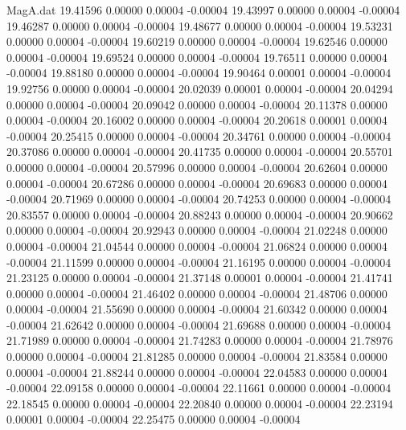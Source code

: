 \begin{filecontents}{MagA.dat}
  19.41596    0.00000    0.00004   -0.00004
  19.43997    0.00000    0.00004   -0.00004
  19.46287    0.00000    0.00004   -0.00004
  19.48677    0.00000    0.00004   -0.00004
  19.53231    0.00000    0.00004   -0.00004
  19.60219    0.00000    0.00004   -0.00004
  19.62546    0.00000    0.00004   -0.00004
  19.69524    0.00000    0.00004   -0.00004
  19.76511    0.00000    0.00004   -0.00004
  19.88180    0.00000    0.00004   -0.00004
  19.90464    0.00001    0.00004   -0.00004
  19.92756    0.00000    0.00004   -0.00004
  20.02039    0.00001    0.00004   -0.00004
  20.04294    0.00000    0.00004   -0.00004
  20.09042    0.00000    0.00004   -0.00004
  20.11378    0.00000    0.00004   -0.00004
  20.16002    0.00000    0.00004   -0.00004
  20.20618    0.00001    0.00004   -0.00004
  20.25415    0.00000    0.00004   -0.00004
  20.34761    0.00000    0.00004   -0.00004
  20.37086    0.00000    0.00004   -0.00004
  20.41735    0.00000    0.00004   -0.00004
  20.55701    0.00000    0.00004   -0.00004
  20.57996    0.00000    0.00004   -0.00004
  20.62604    0.00000    0.00004   -0.00004
  20.67286    0.00000    0.00004   -0.00004
  20.69683    0.00000    0.00004   -0.00004
  20.71969    0.00000    0.00004   -0.00004
  20.74253    0.00000    0.00004   -0.00004
  20.83557    0.00000    0.00004   -0.00004
  20.88243    0.00000    0.00004   -0.00004
  20.90662    0.00000    0.00004   -0.00004
  20.92943    0.00000    0.00004   -0.00004
  21.02248    0.00000    0.00004   -0.00004
  21.04544    0.00000    0.00004   -0.00004
  21.06824    0.00000    0.00004   -0.00004
  21.11599    0.00000    0.00004   -0.00004
  21.16195    0.00000    0.00004   -0.00004
  21.23125    0.00000    0.00004   -0.00004
  21.37148    0.00001    0.00004   -0.00004
  21.41741    0.00000    0.00004   -0.00004
  21.46402    0.00000    0.00004   -0.00004
  21.48706    0.00000    0.00004   -0.00004
  21.55690    0.00000    0.00004   -0.00004
  21.60342    0.00000    0.00004   -0.00004
  21.62642    0.00000    0.00004   -0.00004
  21.69688    0.00000    0.00004   -0.00004
  21.71989    0.00000    0.00004   -0.00004
  21.74283    0.00000    0.00004   -0.00004
  21.78976    0.00000    0.00004   -0.00004
  21.81285    0.00000    0.00004   -0.00004
  21.83584    0.00000    0.00004   -0.00004
  21.88244    0.00000    0.00004   -0.00004
  22.04583    0.00000    0.00004   -0.00004
  22.09158    0.00000    0.00004   -0.00004
  22.11661    0.00000    0.00004   -0.00004
  22.18545    0.00000    0.00004   -0.00004
  22.20840    0.00000    0.00004   -0.00004
  22.23194    0.00001    0.00004   -0.00004
  22.25475    0.00000    0.00004   -0.00004

\end{filecontents}
